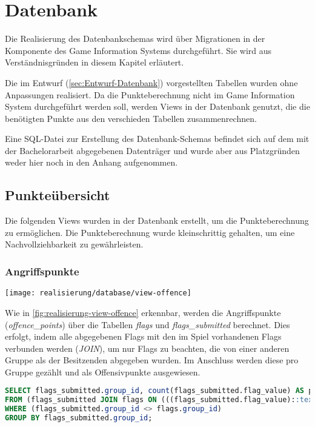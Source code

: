 \section{Datenbank}\label{sec:Realisierung-Datenbank}

Die Realisierung des Datenbankschemas wird über Migrationen in der Komponente des Game Information Systems durchgeführt. Sie wird aus Verständnisgründen in diesem Kapitel erläutert.

Die im Entwurf (\autoref{sec:Entwurf-Datenbank}) vorgestellten Tabellen wurden ohne Anpassungen realisiert. Da die Punkteberechnung nicht im Game Information System durchgeführt werden soll, werden Views in der Datenbank genutzt, die die benötigten Punkte aus den verschieden Tabellen zusammenrechnen.

Eine SQL-Datei zur Erstellung des Datenbank-Schemas befindet sich auf dem mit der Bachelorarbeit abgegebenen Datenträger und wurde aber aus Platzgründen weder hier noch in den Anhang aufgenommen.

\subsection{Punkteübersicht}
Die folgenden Views wurden in der Datenbank erstellt, um die Punkteberechnung zu ermöglichen. Die Punkteberechnung wurde kleinschrittig gehalten, um eine Nachvollziehbarkeit zu gewährleisten.

\subsubsection{Angriffspunkte}\label{subsubsec:Angriffspunkte}
\begin{center}
	\texttt{[image: realisierung/database/view-offence]}
	\label{fig:realisierung-view-offence}
\end{center}

Wie in \autoref{fig:realisierung-view-offence} erkennbar, werden die Angriffspunkte (\textit{offence\_points}) über die Tabellen \textit{flags} und \textit{flags\_submitted} berechnet. Dies erfolgt, indem alle abgegebenen Flags mit den im Spiel vorhandenen Flags verbunden werden (\textit{JOIN}), um nur Flags zu beachten, die von einer anderen Gruppe als der Besitzenden abgegeben wurden. Im Anschluss werden diese pro Gruppe gezählt und als Offensivpunkte ausgewiesen.

\begin{lstlisting}[frame=single, language=sql, caption={SQL View Angriffspunkte}, captionpos=b, label={lst:database-offence-points}]
SELECT flags_submitted.group_id, count(flags_submitted.flag_value) AS points
FROM (flags_submitted JOIN flags ON (((flags_submitted.flag_value)::text = (flags.flag_value)::text)))
WHERE (flags_submitted.group_id <> flags.group_id)
GROUP BY flags_submitted.group_id;
\end{lstlisting}

